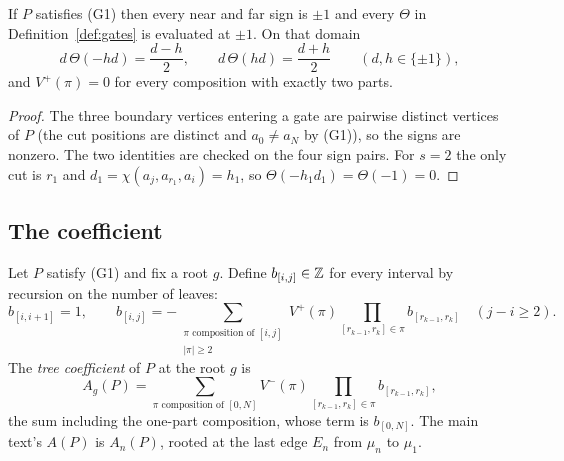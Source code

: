\begin{lemma}\label{lem:gates-nonzero}
If $P$ satisfies (G1) then every near and far sign is $\pm1$ and every
$\Theta$ in Definition~\ref{def:gates} is evaluated at $\pm1$. On that
domain
\[
d\,\Theta(-hd)=\frac{d-h}{2},\qquad d\,\Theta(hd)=\frac{d+h}{2}\qquad(d,h\in\{\pm1\}),
\]
and $V^+(\pi)=0$ for every composition with exactly two parts.
\end{lemma}
\begin{proof}
The three boundary vertices entering a gate are pairwise distinct vertices of
$P$ (the cut positions are distinct and $a_0\neq a_N$ by (G1)), so the signs
are nonzero. The two identities are checked on the four sign pairs. For
$s=2$ the only cut is $r_1$ and $d_1=\chi(a_j,a_{r_1},a_i)=h_1$, so
$\Theta(-h_1d_1)=\Theta(-1)=0$.
\end{proof}

\subsection{The coefficient}

\begin{definition}\label{def:treesum}
Let $P$ satisfy (G1) and fix a root $g$. Define $b_{[i,j]}\in\mathbb Z$ for every
interval by recursion on the number of leaves:
\[
b_{[i,i+1]}=1,\qquad
b_{[i,j]}=-\sum_{\substack{\pi\text{ composition of }[i,j]\\|\pi|\geq2}}
V^+(\pi)\prod_{[r_{k-1},r_k]\in\pi}b_{[r_{k-1},r_k]}\quad(j-i\geq2).
\]
The \emph{tree coefficient} of $P$ at the root $g$ is
\[
A_g(P)=\sum_{\pi\text{ composition of }[0,N]}
V^-(\pi)\prod_{[r_{k-1},r_k]\in\pi}b_{[r_{k-1},r_k]},
\]
the sum including the one-part composition, whose term is $b_{[0,N]}$. The main
text's $A(P)$ is $A_n(P)$, rooted at the last edge $E_n$ from $\mu_n$ to
$\mu_1$.
\end{definition}

